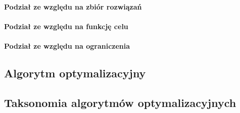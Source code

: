 \paragraph{Podział ze względu na zbiór rozwiązań}

\paragraph{Podział ze względu na funkcję celu}

\paragraph{Podział ze względu na ograniczenia}

\subsection{Algorytm optymalizacyjny \label{subsec:optim-alg}}

\subsection{Taksonomia algorytmów optymalizacyjnych \label{subsec:optim-alg-takson}}
